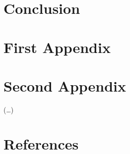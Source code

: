 \documentclass[12pt,twoside]{reedthesis}
\begin{document}
\hypertarget{conclusion}{%
\chapter{Conclusion}\label{conclusion}}

\appendix

\hypertarget{first-appendix}{%
\chapter{First Appendix}\label{first-appendix}}

\hypertarget{second-appendix}{%
\chapter{Second Appendix}\label{second-appendix}}

(\ldots)

\backmatter

\hypertarget{references}{%
\chapter*{References}\label{references}}


\noindent

\setlength{\parindent}{-0.20in}
\end{document}
